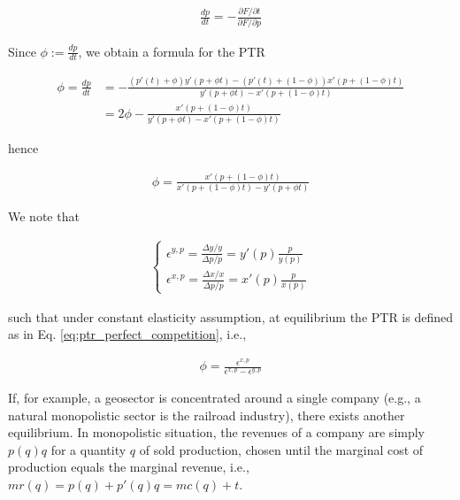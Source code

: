 \documentclass{article}
\begin{document}
\begin{align*}
    \frac{dp}{dt} = -\frac{\partial F/ \partial t}{\partial F/\partial p}
\end{align*}

\noindent Since $\phi := \frac{dp}{dt}$, we obtain a formula for the PTR

\begin{align*}
    \phi = \frac{dp}{dt} & = -\frac{(p'(t) + \phi)y'(p+\phi t) - (p'(t) + (1 - \phi))x'(p+(1-\phi) t)}{y'(p+\phi t) - x'(p+(1-\phi) t)} \\
        &= 2\phi - \frac{x'(p+(1 - \phi) t)}{y'(p+\phi t) - x'(p+(1-\phi) t)}
\end{align*}

\noindent hence

\begin{align*}
    \phi = \frac{x'(p+(1 - \phi) t)}{x'(p+(1-\phi) t) - y'(p+\phi t)}
\end{align*}


\noindent We note that

\begin{align}
    \begin{cases}
        \epsilon^{y,p} = \frac{\Delta y / y}{\Delta p / p} = y'(p) \frac{p}{y(p)} \\
        \epsilon^{x,p} = \frac{\Delta x / x}{\Delta p / p} = x'(p) \frac{p}{x(p)}
    \end{cases}
\end{align}

\noindent such that under constant elasticity assumption, at equilibrium the PTR is defined as in Eq. \eqref{eq:ptr_perfect_competition}, i.e., 

\begin{align*}
    \phi = \frac{\epsilon^{x,p}}{\epsilon^{x,p} - \epsilon^{y,p}}
\end{align*}

If, for example, a geosector is concentrated around a single company (e.g., a natural monopolistic sector is the railroad industry), there exists another equilibrium. In monopolistic situation, the revenues of a company are simply $p(q)q$ for a quantity $q$ of sold production, chosen until the marginal cost of production equals the marginal revenue, i.e., $mr(q)=p(q) + p'(q)q=mc(q) + t$. 

\vspace{0.1cm}
\end{document}
